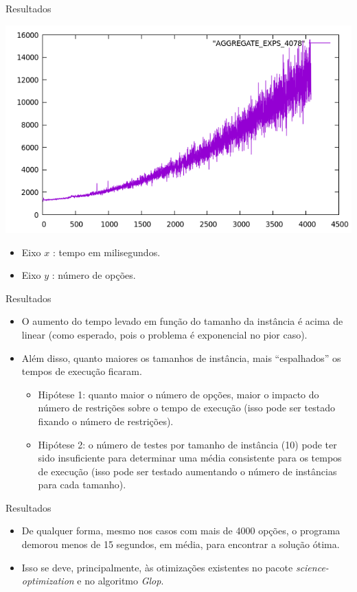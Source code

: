\documentclass{beamer}
\begin{document}
\begin{frame}{Resultados}
\begin{center}
\includegraphics[scale=0.3]{GRAPH_FOR_PRESENTATION.png}
\end{center}
\begin{itemize}
\item Eixo $x$ : tempo em milisegundos.
\item Eixo $y$ : número de opções.
\end{itemize}
\end{frame}

\begin{frame}{Resultados}
\begin{itemize}
\item O aumento do tempo levado em função do tamanho da instância é acima de linear (como esperado, pois o problema é exponencial no pior caso).\pause
\item Além disso, quanto maiores os tamanhos de instância, mais ``espalhados'' os tempos de execução ficaram.\pause
\begin{itemize}
\item Hipótese 1: quanto maior o número de opções, maior o impacto do número de restrições sobre o tempo de execução (isso pode ser testado fixando o número de restrições).\pause
\item Hipótese 2: o número de testes por tamanho de instância (10) pode ter sido insuficiente para determinar uma média consistente para os tempos de execução 
(isso pode ser testado aumentando o número de instâncias para cada tamanho).\pause
\end{itemize}
\end{itemize}
\end{frame}

\begin{frame}{Resultados}
\begin{itemize}
\item De qualquer forma, mesmo nos casos com mais de 4000 opções, o programa demorou menos de 15 segundos, em média, para encontrar a solução ótima. \pause
\item Isso se deve, principalmente, às otimizações existentes no pacote \emph{science-optimization} e no algoritmo \emph{Glop}.
\end{itemize}
\end{frame}
\end{document}
